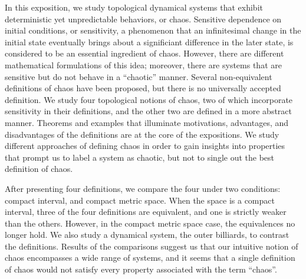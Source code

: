 \documentclass[10pt,twoside,draft]{book}
\begin{document}
In this exposition, we study topological dynamical systems that exhibit deterministic yet unpredictable behaviors, or chaos.
Sensitive dependence on initial conditions, or sensitivity, a phenomenon that an infinitesimal change in the initial state eventually brings about a significiant difference in the later state, is considered to be an essential ingredient of chaos. 
However, there are different mathematical formulations of this idea; moreover, there are systems that are sensitive but do not behave in a ``chaotic'' manner.
Several non-equivalent definitions of chaos have been proposed, but there is no universally accepted definition.
We study four topological notions of chaos, two of which incorporate sensitivity in their definitions, and the other two are defined in a more abstract manner. %
Theorems and examples that illuminate motivations, advantages, and disadvantages of the definitions are at the core of the expositions.
We study different approaches of defining chaos in order to gain insights into properties that prompt us to label a system as chaotic, but not to single out the best definition of chaos.

After presenting four definitions, we compare the four under two conditions: compact interval, and compact metric space.
When the space is a compact interval, three of the four definitions are equivalent, and one is strictly weaker than the others.
However, in the compact metric space case, the equivalences no longer hold.
We also study a dynamical system, the outer billiards, to contrast the definitions. %
Results of the comparisons suggest us that our intuitive notion of chaos encompasses a wide range of systems, and it seems that a single definition of chaos would not satisfy every property associated with the term ``chaos''.



\end{document}

